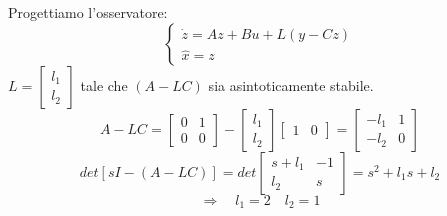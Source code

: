 \documentclass[../main.tex]{subfiles}
\begin{document}
\begin{mdframed}[style=Exercise]
\begin{Exercise}[title={Stabilizzazione di un sistema con osservatore}, difficulty=1]
				Progettiamo l'osservatore:
				\[
					\begin{cases}
						\dot z = Az + Bu +L(y-Cz)\\
						\hat x = z
					\end{cases}
				\]
				$ L = \begin{bmatrix} l_1 \\ l_2 \end{bmatrix} $ tale che $ (A-LC) $ sia asintoticamente stabile.
				\[
					A-LC = 
					\begin{bmatrix}
						0 & 1\\
						0 & 0
					\end{bmatrix} -
					\begin{bmatrix}
						l_1\\
						l_2
					\end{bmatrix}
					\begin{bmatrix}
						1 & 0
					\end{bmatrix} = 
					\begin{bmatrix}
						-l_1 & 1\\
						-l_2 & 0
					\end{bmatrix}
				\]
				\[
					det\left[ sI - (A-LC) \right] = det 
					\begin{bmatrix}
						s+l_1 & -1\\
						l_2 & s
					\end{bmatrix} = s^2 + l_1 s + l_2
				\]
				\[
					\Rightarrow\quad l_1 = 2 \quad l_2 = 1
				\]
			\end{Exercise}
		\end{mdframed}
\end{document}
